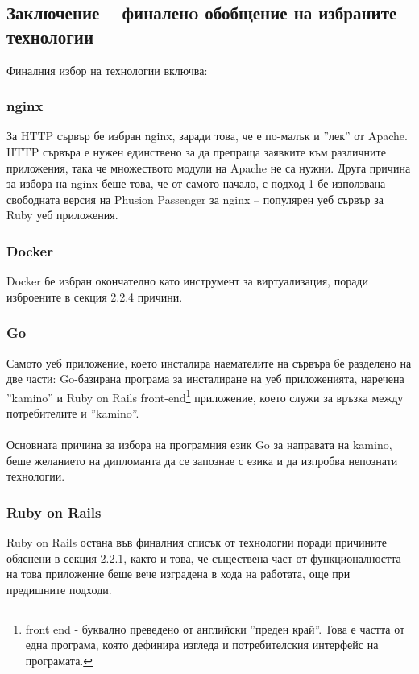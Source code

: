\documentclass[pdftex,14pt,a4paper]{extreport}
\begin{document}
\subsection {Заключение – финаленo обобщение на избраните технологии}
Финалния избор на технологии включва:
\subsubsection {nginx}
За HTTP сървър бе избран nginx, заради това, че е по-малък и ''лек'' от Apache. HTTP сървъра е нужен единствено за да препраща заявките към различните приложения, така че множеството модули на Apache не са нужни. Друга причина за избора на nginx беше това, че от самото начало, с подход 1 бе използвана свободната версия на Phusion Passenger за nginx – популярен уеб сървър за Ruby уеб приложения.
\subsubsection {Docker}
Docker бе избран окончателно като инструмент за виртуализация, поради изброените в секция 2.2.4 причини.
\subsubsection {Go}
Самото уеб приложение, което инсталира наемателите на сървъра бе разделено на две части: Go-базирана програма за инсталиране на уеб приложенията, наречена ''kamino'' и Ruby on Rails front-end\footnote {front end - буквално преведено от английски ''преден край''. Това е частта от една програма, която дефинира изгледа и потребителския интерфейс на програмата.} приложение, което служи за връзка между потребителите и ''kamino''.
\paragraph {}

Основната причина за избора на програмния език Go за направата на kamino, беше желанието на дипломанта да се запознае с езика и да изпробва непознати технологии.
\subsubsection {Ruby on Rails}
Ruby on Rails остана във финалния списък от технологии поради причините обяснени в секция 2.2.1, както и това, че съществена част от функционалността на това приложение беше вече изградена в хода на работата, още при предишните подходи.
\end{document}
